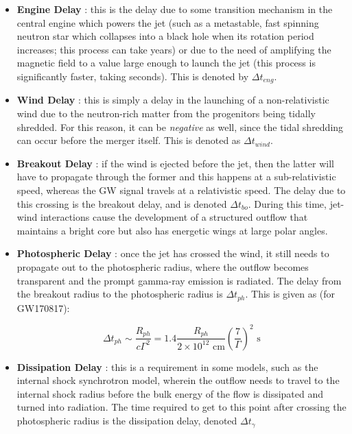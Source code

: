     \begin{itemize}

        \item \textbf{Engine Delay} : this is the delay due to some transition
            mechanism in the central engine which powers the jet (such as a
            metastable, fast spinning neutron star which collapses into a black
            hole when its rotation period increases; this process can take
            years) or due to the need of amplifying the magnetic field to a
            value large enough to launch the jet  (this process is significantly
            faster, taking seconds). This is denoted by $\Delta t_{eng}$.

        \item \textbf{Wind Delay} : this is simply a delay in the launching of a
            non-relativistic wind due to the neutron-rich matter from the
            progenitors being tidally shredded. For this reason, it can be
            \textit{negative} as well, since the tidal shredding can occur
            before the merger itself. This is denoted as $\Delta t_{wind}$.

        \item \textbf{Breakout Delay} : if the wind is ejected before the jet,
            then the latter will have to propagate through the former and this
            happens at a sub-relativistic speed, whereas the GW signal travels
            at a relativistic speed. The delay due to this crossing is the
            breakout delay, and is denoted $\Delta t_{bo}$. During this time,
            jet-wind interactions cause the development of a structured outflow
            that maintains a bright core but also has energetic wings at large
            polar angles.

        \item \textbf{Photospheric Delay} :  once the jet has crossed the wind,
            it still needs to propagate out to the photospheric radius, where
            the outflow becomes transparent and the prompt gamma-ray emission is
            radiated. The delay from the breakout radius to the photospheric
            radius is $\Delta t_{ph}$. This is given as (for GW170817):

            \begin{equation}
                \label{eq:4}
                \Delta t_{ph} \sim \dfrac{R_{ph}}{c \Gamma^2} =
                1.4 \dfrac{R_{ph}}{2 \times 10^{12} \text{ cm}}
                \left( \dfrac{7} {\Gamma} \right)^2 \text{ s}
            \end{equation}

        \item \textbf{Dissipation Delay} : this is a requirement in some models,
            such as the internal shock synchrotron model, wherein the outflow
            needs to travel to the internal shock radius before the bulk energy
            of the flow is dissipated and turned into radiation. The time
            required to get to this point after crossing the photospheric radius
            is the dissipation delay, denoted $\Delta t_{\gamma}$

    \end{itemize}


